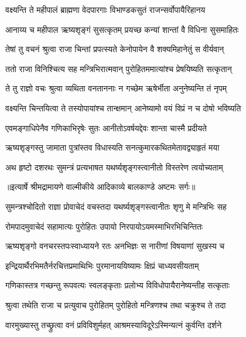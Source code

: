 \twolineshloka
{वक्ष्यन्ति ते महीपालं ब्राह्मणा वेदपारगाः}
{विभाण्डकसुतं राजन्सर्वोपायैरिहानय} %

\twolineshloka
{आनाय्य च महीपाल ऋष्यशृङ्गं सुसत्कृतम्}
{प्रयच्छ कन्यां शान्तां वै विधिना सुसमाहितः} %

\twolineshloka
{तेषां तु वचनं श्रुत्वा राजा चिन्तां प्रपत्स्यते}
{केनोपायेन वै शक्यमिहानेतुं स वीर्यवान्} %

\twolineshloka
{ततो राजा विनिश्चित्य सह मन्त्रिभिरात्मवान्}
{पुरोहितममात्यांश्च प्रेषयिष्यति सत्कृतान्} %

\twolineshloka
{ते तु राज्ञो वचः श्रुत्वा व्यथिता वनताननाः}
{न गच्छेम ऋषेर्भीता अनुनेष्यन्ति तं नृपम्} %

\twolineshloka
{वक्ष्यन्ति चिन्तयित्वा ते तस्योपायांश्च तान्क्षमान्}
{आनेष्यामो वयं विप्रं न च दोषो भविष्यति} %

\twolineshloka
{एवमङ्गाधिपेनैव गणिकाभिरृषेः सुतः}
{आनीतोऽवर्षयद्देवः शान्ता चास्मै प्रदीयते} %

\twolineshloka
{ऋष्यशृङ्गस्तु जामाता पुत्रांस्तव विधास्यति}
{सनत्कुमारकथितमेतावद्व्याहृतं मया} %

\twolineshloka
{अथ हृष्टो दशरथः सुमन्त्रं प्रत्यभाषत}
{यथर्ष्यशृङ्गस्त्वानीतो विस्तरेण त्वयोच्यताम्} %


{॥इत्यार्षे श्रीमद्रामायणे वाल्मीकीये आदिकाव्ये बालकाण्डे अष्टमः सर्गः॥}


\twolineshloka
{सुमन्त्रश्चोदितो राज्ञा प्रोवाचेदं वचस्तदा}
{यथर्ष्यशृङ्गस्त्वानीतः शृणु मे मन्त्रिभिः सह} %

\twolineshloka
{रोमपादमुवाचेदं सहामात्यः पुरोहितः}
{उपायो निरपायोऽयमस्माभिरभिचिन्तितः} %

\twolineshloka
{ऋष्यशृङ्गो वनचरस्तपःस्वाध्यायने रतः}
{अनभिज्ञः स नारीणां विषयाणां सुखस्य च} %

\twolineshloka
{इन्द्रियार्थैरभिमतैर्नरचित्तप्रमाथिभिः}
{पुरमानाययिष्यामः क्षिप्रं चाध्यवसीयताम्} %

\twolineshloka
{गणिकास्तत्र गच्छन्तु रूपवत्यः स्वलङ्कृताः}
{प्रलोभ्य विविधोपायैरानेष्यन्तीह सत्कृताः} %

\twolineshloka
{श्रुत्वा तथेति राजा च प्रत्युवाच पुरोहितम्}
{पुरोहितो मन्त्रिणश्च तथा चक्रुश्च ते तदा} %

\twolineshloka
{वारमुख्यास्तु तच्छ्रुत्वा वनं प्रविविशुर्महत्}
{आश्रमस्याविदूरेऽस्मिन्यत्नं कुर्वन्ति दर्शने} %

